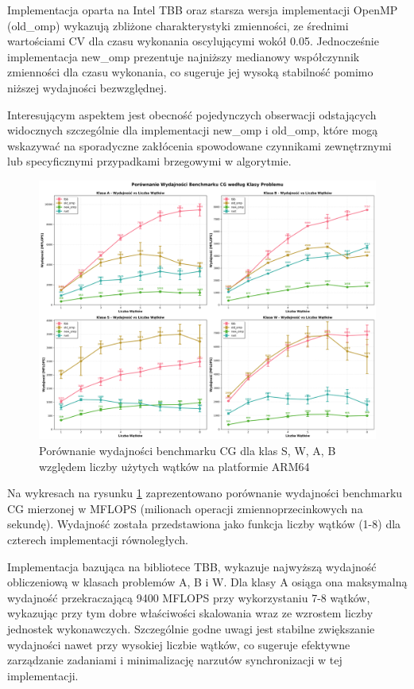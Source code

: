 Implementacja oparta na Intel TBB oraz starsza wersja implementacji OpenMP (old\_omp) wykazują zbliżone charakterystyki zmienności, ze średnimi wartościami CV dla czasu wykonania oscylującymi wokół 0.05. Jednocześnie implementacja new\_omp prezentuje najniższy medianowy współczynnik zmienności dla czasu wykonania, co sugeruje jej wysoką stabilność pomimo niższej wydajności bezwzględnej.

Interesującym aspektem jest obecność pojedynczych obserwacji odstających widocznych szczególnie dla implementacji new\_omp i old\_omp, które mogą wskazywać na sporadyczne zakłócenia spowodowane czynnikami zewnętrznymi lub specyficznymi przypadkami brzegowymi w algorytmie.

\begin{figure}[H]
    \centering
    \includegraphics[width=\textwidth]{analiza/images/parallel/cg/x86/cg_porownanie_wydajnosci.png}
    \caption{Porównanie wydajności benchmarku CG dla klas S, W, A, B względem liczby użytych wątków na platformie ARM64}
    \label{cg_porownanie_wydajnosci_x86_64}
\end{figure}
Na wykresach na rysunku \ref{cg_porownanie_wydajnosci_x86_64} zaprezentowano porównanie wydajności benchmarku CG mierzonej w MFLOPS (milionach operacji zmiennoprzecinkowych na sekundę). Wydajność została przedstawiona jako funkcja liczby wątków (1-8) dla czterech implementacji równoległych.

Implementacja bazująca na bibliotece TBB, wykazuje najwyższą wydajność obliczeniową w klasach problemów A, B i W. Dla klasy A osiąga ona maksymalną wydajność przekraczającą 9400 MFLOPS przy wykorzystaniu 7-8 wątków, wykazując przy tym dobre właściwości skalowania wraz ze wzrostem liczby jednostek wykonawczych. Szczególnie godne uwagi jest stabilne zwiększanie wydajności nawet przy wysokiej liczbie wątków, co sugeruje efektywne zarządzanie zadaniami i minimalizację narzutów synchronizacji w tej implementacji.

